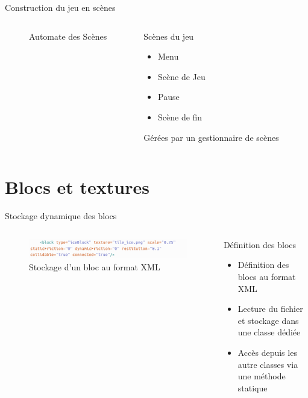 \documentclass{beamer}
\begin{document}
{\begin{frame}{Construction du jeu en scènes}
    \begin{columns}
            \begin{figure}
                \centering
                
                \caption{Automate des Scènes}
            \end{figure}
            \begin{block}{Scènes du jeu}
                \begin{itemize}
                    \item[\bullet] Menu
                    \item[\bullet] Scène de Jeu
                    \item[\bullet] Pause
                    \item[\bullet] Scène de fin
                \end{itemize}
                Gérées par un gestionnaire de scènes
            \end{block}
    \end{columns}
\end{frame}

\section{Blocs et textures}
\begin{frame}{Stockage dynamique des blocs}
    \begin{columns}
            \begin{figure}
                \centering
                \includegraphics[width=1.0\textwidth]{images/XMLfile}
                \caption{Stockage d'un bloc au format XML}
            \end{figure}
            \begin{block}{Définition des blocs}
                \begin{itemize}
                    \item[\bullet] Définition des blocs au format XML
                    \item[\bullet] Lecture du fichier et stockage dans une classe dédiée
                    \item[\bullet] Accès depuis les autre classes via une méthode statique
                \end{itemize}
            \end{block}
    \end{columns}
\end{frame}

}
\end{document}
